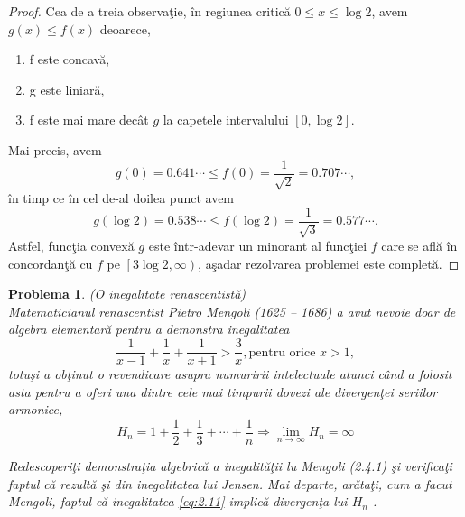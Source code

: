 \documentclass[a4paper,12pt,oneside]{report}
\newtheorem{problem}{Problema}
\begin{document}
\begin{proof}
Cea de a treia observa\c{t}ie, \^{i}n regiunea critic\u{a} \(0\leq  x \leq \log2\), avem \(g\left ( x \right ) \leq  f\left ( x \right )\) deoarece,
\begin{enumerate}
  \item f este concav\u{a},
  \item g este liniar\u{a},
  \item f este mai mare dec\^{a}t \(g\) la capetele intervalului \(\left [ 0 , \log 2 \right ]\).
\end{enumerate}
Mai precis, avem
\begin{displaymath}
  g\left ( 0 \right ) = 0.641\cdots \leq f\left ( 0 \right ) = \frac{1}{\sqrt{2}} = 0.707\cdots,
\end{displaymath}
\^{i}n timp ce \^{i}n cel de-al doilea punct avem
\begin{displaymath}
  g\left ( \log 2 \right ) = 0.538\cdots  \leq f\left ( \log2 \right ) = \frac{1}{\sqrt{3}} = 0.577\cdots.
\end{displaymath}
Astfel, func\c{t}ia convex\u{a} \(g\) este \^{i}ntr-adevar un minorant al func\c{t}iei \(f\) care se afl\u{a} \^{i}n concordan\c{t}\u{a} cu \(f\) pe \(\left [ 3\log 2 , \infty  \right )\), a\c{s}adar rezolvarea problemei este complet\u{a}.
\end{proof}
\begin{problem} (O inegalitate renascentist\u{a})\\
   Matematicianul renascentist Pietro Mengoli (1625 – 1686) a avut nevoie doar de algebra elementar\u{a} pentru a demonstra inegalitatea
 \begin{displaymath}
   \frac{1}{x - 1} + \frac{1}{x} + \frac{1}{x + 1} > \frac{3}{x} , \text{pentru orice } x > 1, \label{eq:2.11} \tag{2.11}
 \end{displaymath}
totu\c{s}i a ob\c{t}inut o revendicare asupra numuririi intelectuale atunci c\^{a}nd a folosit asta pentru a oferi una dintre cele mai timpurii dovezi ale divergen\c{t}ei seriilor armonice,
\begin{displaymath}
  H_{n} = 1 + \frac{1}{2} + \frac{1}{3} + \cdots + \frac{1}{n} \Rightarrow \lim_{n \to \infty } H_{n} = \infty \label{eq:2.12} \tag{2.12}
\end{displaymath}

Redescoperi\c{t}i demonstra\c{t}ia algebric\u{a} a inegalit\u{a}\c{t}ii lu Mengoli (2.4.1) \c{s}i verifica\c{t}i faptul c\u{a} rezult\u{a} \c{s}i din inegalitatea lui Jensen. Mai departe, ar\u{a}ta\c{t}i, cum a facut Mengoli, faptul c\u{a} inegalitatea \ref{eq:2.11} implic\u{a} divergen\c{t}a lui \(H_{n}\) .
\end{problem}
\end{document}
